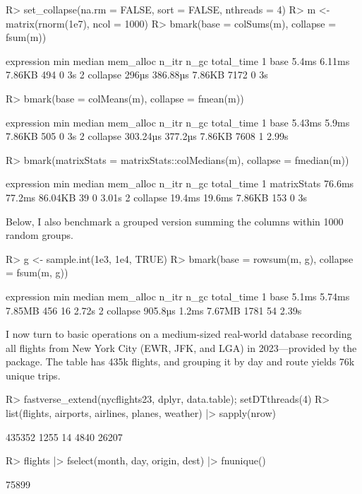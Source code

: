 \documentclass[nojss]{jss} %
\begin{document}
\begin{Schunk}
\begin{Sinput}
R> set_collapse(na.rm = FALSE, sort = FALSE, nthreads = 4)
R> m <- matrix(rnorm(1e7), ncol = 1000)
R> bmark(base = colSums(m), collapse = fsum(m))
\end{Sinput}
\begin{Soutput}
  expression     min   median mem_alloc n_itr n_gc total_time
1       base   5.4ms   6.11ms    7.86KB   494    0         3s
2   collapse   296µs 386.88µs    7.86KB  7172    0         3s
\end{Soutput}
\begin{Sinput}
R> bmark(base = colMeans(m), collapse = fmean(m))
\end{Sinput}
\begin{Soutput}
  expression      min  median mem_alloc n_itr n_gc total_time
1       base   5.43ms   5.9ms    7.86KB   505    0         3s
2   collapse 303.24µs 377.2µs    7.86KB  7608    1      2.99s
\end{Soutput}
\begin{Sinput}
R> bmark(matrixStats = matrixStats::colMedians(m), collapse = fmedian(m))
\end{Sinput}
\begin{Soutput}
   expression    min median mem_alloc n_itr n_gc total_time
1 matrixStats 76.6ms 77.2ms   86.04KB    39    0      3.01s
2    collapse 19.4ms 19.6ms    7.86KB   153    0         3s
\end{Soutput}
\end{Schunk}
%
Below, I also benchmark a grouped version summing the columns within 1000 random groups.
%
\begin{Schunk}
\begin{Sinput}
R> g <- sample.int(1e3, 1e4, TRUE)
R> bmark(base = rowsum(m, g), collapse = fsum(m, g))
\end{Sinput}
\begin{Soutput}
  expression     min median mem_alloc n_itr n_gc total_time
1       base   5.1ms 5.74ms    7.85MB   456   16      2.72s
2   collapse 905.8µs  1.2ms    7.67MB  1781   54      2.39s
\end{Soutput}
\end{Schunk}
%
I now turn to basic operations on a medium-sized real-world database recording all flights from New York City (EWR, JFK, and LGA) in 2023---provided by the  package. The  table has 435k flights, and grouping it by day and route yields 76k unique trips.
%
\begin{Schunk}
\begin{Sinput}
R> fastverse_extend(nycflights23, dplyr, data.table); setDTthreads(4)
R> list(flights, airports, airlines, planes, weather) |> sapply(nrow)
\end{Sinput}
\begin{Soutput}
[1] 435352   1255     14   4840  26207
\end{Soutput}
\begin{Sinput}
R> flights |> fselect(month, day, origin, dest) |> fnunique()
\end{Sinput}
\begin{Soutput}
[1] 75899
\end{Soutput}
\end{Schunk}
\end{document}
